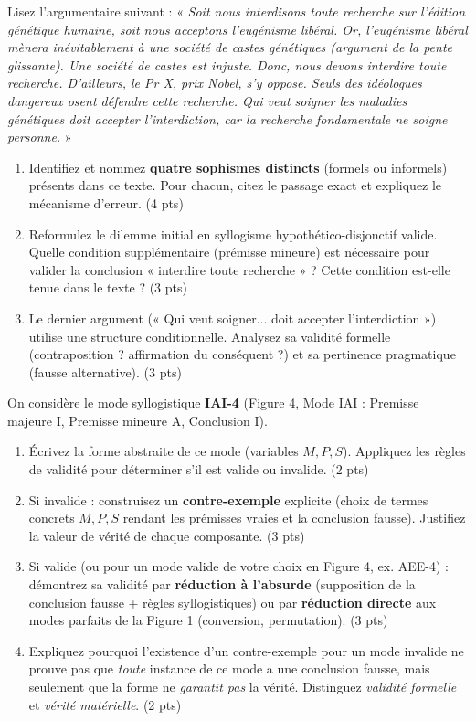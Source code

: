 \documentclass[11pt]{article}
\begin{document}
\begin{exercice}
Lisez l'argumentaire suivant : « \textit{Soit nous interdisons toute recherche sur l'édition génétique humaine, soit nous acceptons l'eugénisme libéral. Or, l'eugénisme libéral mènera inévitablement à une société de castes génétiques (argument de la pente glissante). Une société de castes est injuste. Donc, nous devons interdire toute recherche. D'ailleurs, le Pr X, prix Nobel, s'y oppose. Seuls des idéologues dangereux osent défendre cette recherche. Qui veut soigner les maladies génétiques doit accepter l'interdiction, car la recherche fondamentale ne soigne personne.} »
\begin{enumerate}
    \item Identifiez et nommez \textbf{quatre sophismes distincts} (formels ou informels) présents dans ce texte. Pour chacun, citez le passage exact et expliquez le mécanisme d'erreur. (4 pts)
    \item Reformulez le dilemme initial en syllogisme hypothético-disjonctif valide. Quelle condition supplémentaire (prémisse mineure) est nécessaire pour valider la conclusion « interdire toute recherche » ? Cette condition est-elle tenue dans le texte ? (3 pts)
    \item Le dernier argument (« Qui veut soigner... doit accepter l'interdiction ») utilise une structure conditionnelle. Analysez sa validité formelle (contraposition ? affirmation du conséquent ?) et sa pertinence pragmatique (fausse alternative). (3 pts)
\end{enumerate}
\end{exercice}

\begin{exercice}
On considère le mode syllogistique \textbf{IAI-4} (Figure 4, Mode IAI : Premisse majeure I, Premisse mineure A, Conclusion I).
\begin{enumerate}
    \item Écrivez la forme abstraite de ce mode (variables $M, P, S$). Appliquez les règles de validité pour déterminer s'il est valide ou invalide. (2 pts)
    \item Si invalide : construisez un \textbf{contre-exemple} explicite (choix de termes concrets $M, P, S$ rendant les prémisses vraies et la conclusion fausse). Justifiez la valeur de vérité de chaque composante. (3 pts)
    \item Si valide (ou pour un mode valide de votre choix en Figure 4, ex. AEE-4) : démontrez sa validité par \textbf{réduction à l'absurde} (supposition de la conclusion fausse + règles syllogistiques) ou par \textbf{réduction directe} aux modes parfaits de la Figure 1 (conversion, permutation). (3 pts)
    \item Expliquez pourquoi l'existence d'un contre-exemple pour un mode invalide ne prouve pas que \textit{toute} instance de ce mode a une conclusion fausse, mais seulement que la forme ne \textit{garantit pas} la vérité. Distinguez \textit{validité formelle} et \textit{vérité matérielle}. (2 pts)
\end{enumerate}
\end{exercice}
\end{document}
